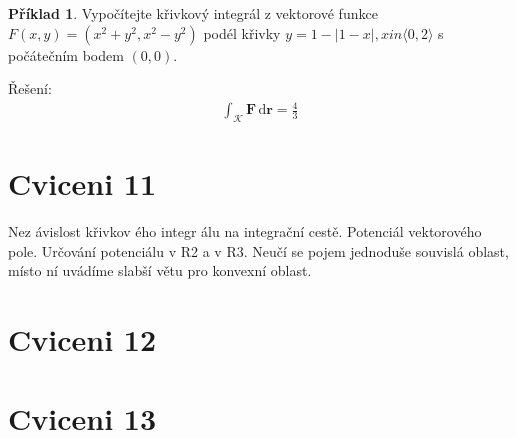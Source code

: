 \documentclass{article}
\theoremstyle{definition}
\newtheorem{exmp}{Příklad}[section]
\newcommand{\vect}[1]{\bm{#1}}
\newenvironment{colbox}[1]
  {\newcommand\colboxcolor{#1}%
   \begin{lrbox}{\selvestebox}%
   \begin{minipage}{\dimexpr\columnwidth-2\fboxsep\relax}}
  {\end{minipage}\end{lrbox}%
   \begin{center}
   \colorbox[HTML]{\colboxcolor}{\usebox{\selvestebox}}
   \end{center}}
\begin{document}
\begin{colbox}{DDDDDD}
\begin{exmp}
    Vypočítejte křivkový integrál z vektorové funkce $F(x,y)=(x^2+y^2,x^2-y^2)$ podél křivky $y=1-|1-x|, x in \langle 0,2\rangle$ s počátečním bodem $(0, 0)$.
\end{exmp}
\end{colbox}
Řešení: 
\begin{align*}
    \int_\mathcal{K}\vect{F}\,\mathrm{d}\vect{r}=\frac{4}{3}
\end{align*}

\clearpage
\newpage
\section{Cviceni 11}

Nez ávislost křivkov ého integr álu na integrační cestě. Potenciál vektorového pole. Určování potenciálu v R2 a v R3. Neučí se pojem jednoduše souvislá oblast, místo ní uvádíme slabší větu pro konvexní oblast.

\clearpage
\newpage
\section{Cviceni 12}

\clearpage
\newpage
\section{Cviceni 13}
\end{document}
